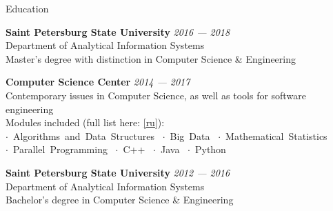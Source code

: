 \documentclass{resume} %
\begin{document}

\begin{rSection}{Education}


{\bf Saint Petersburg State University} \hfill {{\em 2016 --- 2018} \\ 
Department of Analytical Information Systems \\
Master's degree with distinction in Computer Science \& Engineering
}

{\bf Computer Science Center} \hfill {{\em 2014 --- 2017} \\ 
Contemporary issues in Computer Science, as well as tools for software engineering \\
Modules included (full list here:  \href{https://compscicenter.ru/users/734/}{[ru]}): \\
$\cdot$~Algorithms~and~Data~Structures~\hspace{1cm} 
$\cdot$~Big~Data~\hspace{1cm} 
$\cdot$~Mathematical~Statistics~\hspace{1cm}\\
$\cdot$~Parallel~Programming~\hspace{1cm}
$\cdot$~C++~\hspace{1cm} 
$\cdot$~Java~\hspace{1cm} 
$\cdot$~Python~\hspace{1cm}
}

{\bf Saint Petersburg State University} \hfill {{\em 2012 --- 2016} \\ 
Department of Analytical Information Systems \\
Bachelor's degree in Computer Science \& Engineering 
}



\end{rSection}

\end{document}
